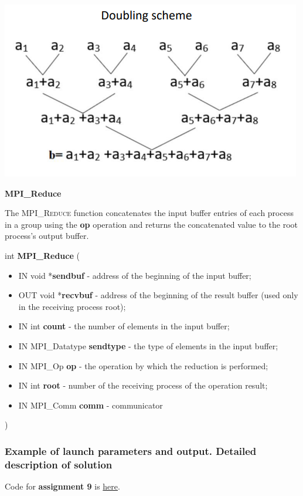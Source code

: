 \documentclass[%
12pt, %
final, %
oneside, %
onecolumn, %
centertags]{article} %
\theoremstyle{plain}
\theoremstyle{definition}
\theoremstyle{remark}
\begin{document}
\begin{center}
\includegraphics[scale=0.75]{9.double.png}
\end{center}

\textbf{MPI\_Reduce}

The \textsc{MPI\_Reduce} function concatenates the input buffer entries of each process in a group 
using the \textbf{op} operation and returns the concatenated value to the root process's output 
buffer.


int \textbf{MPI\_Reduce} (
\begin{itemize}
	\item IN void *\textbf{sendbuf} - address of the beginning of the input buffer;
	\item OUT void *\textbf{recvbuf} - address of the beginning of the result buffer (used only in the receiving 
process root);
	\item IN int \textbf{count} - the number of elements in the input buffer;
	\item IN MPI\_Datatype \textbf{sendtype} - the type of elements in the input buffer;
	\item IN MPI\_Op \textbf{op} - the operation by which the reduction is performed;
	\item IN int \textbf{root} - number of the receiving process of the operation result;
	\item IN MPI\_Comm \textbf{comm} - communicator
\end{itemize}
)

\subsubsection{Example of launch parameters and output. Detailed description of solution}

Code for \textbf{assignment 9} is \href{https:\//github.com/aptmess/parallel_algorithms/blob/master/HT/hw_mpi/Assignment9.c}{here}.
\end{document}
